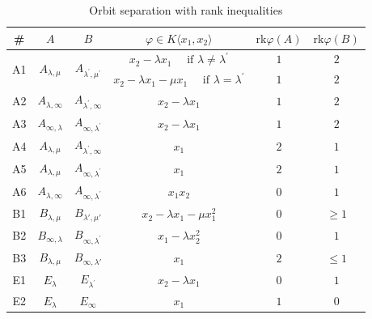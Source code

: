 \documentclass[12pt]{amsart}
\newcommand{\field}{K}
\newcommand{\rank}{\mathrm{rk}}
\begin{document}
\begin{table}[ht]
\centering
\small
\caption{Orbit separation with rank inequalities}
\label{Tab2}
{
\renewcommand{\arraystretch}{2} 
\setlength{\tabcolsep}{10pt} 
\begin{tabular}{|c||c||c||c||c||c|}
\hline
\textbf{\#} & $A$ & $B$ & $\varphi \in \field \langle x_1, x_2\rangle$ & $\rank \varphi(A)$ & $\rank \varphi(B)$ \\
\hline
\hline
\multirow{2}{*}{A1} & \multirow{2}{*}{$A_{\lambda, \mu}$} & \multirow{2}{*}{$A_{\lambda^{\prime}, \mu^{\prime}}$} & $x_2 - \lambda x_1 \quad \text{ if } \lambda \neq \lambda^{\prime}$ & $1$ & $2$ \\
\cline{4-6}
& & & $x_2 - \lambda x_1 - \mu x_1 \quad \text{ if } \lambda = \lambda^{\prime}$ & $1$ & $2$ \\
\hline
A2 & $A_{\lambda, \infty}$ & $A_{\lambda^{\prime}, \infty}$ & $x_2 - \lambda x_1$ & $1$ & $2$ \\
\hline
A3 & $A_{\infty, \lambda}$ & $A_{\infty, \lambda^{\prime}}$ & $x_2 - \lambda x_1$ & $1$ & $2$ \\
\hline
A4 & $A_{\lambda, \mu}$ & $A_{\lambda^{\prime}, \infty}$ & $x_1$ & $2$ & $1$ \\
\hline
A5 & $A_{\lambda, \mu}$ & $A_{\infty, \lambda^{\prime}}$ & 
$x_1$ & $2$ & $1$ \\
\hline
A6 & $A_{\lambda, \infty}$ & $A_{\infty, \lambda^{\prime}}$ & $x_1 x_2$ & $0$ & $1$ \\
\hline
\hline
B1 & $B_{\lambda,\mu}$ & $B_{\lambda',\mu'}$ &  $x_2 - \lambda x_1-\mu x_1^2$ & $0$ & $\ge 1$ \\ 
\hline
B2 & $B_{\infty, \lambda}$ & $B_{\infty, \lambda^{\prime}}$ & $x_1 - \lambda x_2^{2}$ & $0$ & $1$ \\
\hline
B3 & $B_{\lambda, \mu}$ & $B_{\infty, \lambda'}$ & $x_1$ & $2$ & $\le 1$ \\
\hline
\hline
E1 & $E_{\lambda}$ & $E_{\lambda^{\prime}}$ & $x_2 - \lambda x_1$ & $0$ & $1$ \\
\hline
E2 & $E_{\lambda}$ & $E_{\infty}$ & $x_1$ & $1$ & $0$ \\
\hline
\end{tabular}
}
\end{table}

\newpage
\end{document}
